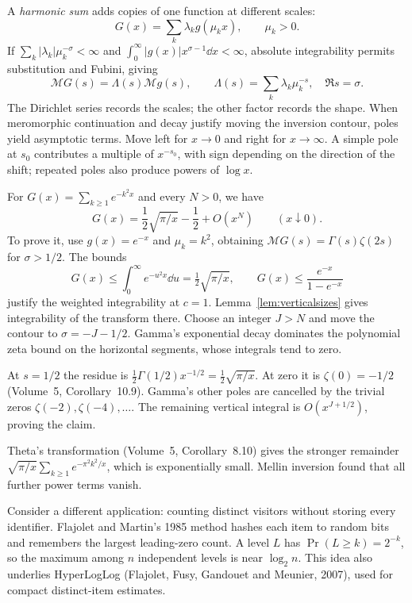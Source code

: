 A \emph{harmonic sum} adds copies of one function at different scales:
\[G(x)=\sum_k\lambda_kg(\mu_kx),\qquad\mu_k>0.\]
If $\sum_k|\lambda_k|\mu_k^{-\sigma}<\infty$ and $\int_0^\infty|g(x)|x^{\sigma-1}\dd x<\infty$, absolute integrability permits substitution and Fubini, giving
\begin{equation}\label{eq:harmonicsum}
\mathcal MG(s)=\Lambda(s)\mathcal Mg(s),\qquad
\Lambda(s)=\sum_k\lambda_k\mu_k^{-s},\quad\Re s=\sigma.
\end{equation}
The Dirichlet series records the scales; the other factor records the shape. When meromorphic continuation and decay justify moving the inversion contour, poles yield asymptotic terms. Move left for $x\to0$ and right for $x\to\infty$. A simple pole at $s_0$ contributes a multiple of $x^{-s_0}$, with sign depending on the direction of the shift; repeated poles also produce powers of $\log x$.

\begin{example}\label{ex:thetamellin}
For $G(x)=\sum_{k\ge1}e^{-k^2x}$ and every $N>0$, we have
\[G(x)=\frac12\sqrt{\pi/x}-\frac12+O(x^N)\qquad(x\downarrow0).
\]
To prove it, use $g(x)=e^{-x}$ and $\mu_k=k^2$, obtaining $\mathcal MG(s)=\Gamma(s)\zeta(2s)$ for $\sigma>1/2$. The bounds
\[G(x)\le\int_0^\infty e^{-u^2x}\dd u=\tfrac12\sqrt{\pi/x},\qquad
G(x)\le\frac{e^{-x}}{1-e^{-x}}
\]
justify the weighted integrability at $c=1$. Lemma~\ref{lem:verticalsizes} gives integrability of the transform there. Choose an integer $J>N$ and move the contour to $\sigma=-J-1/2$. Gamma's exponential decay dominates the polynomial zeta bound on the horizontal segments, whose integrals tend to zero.

At $s=1/2$ the residue is $\tfrac12\Gamma(1/2)x^{-1/2}=\tfrac12\sqrt{\pi/x}$. At zero it is $\zeta(0)=-1/2$ (Volume~5, Corollary~10.9). Gamma's other poles are cancelled by the trivial zeros $\zeta(-2),\zeta(-4),\ldots$. The remaining vertical integral is $O(x^{J+1/2})$, proving the claim.
\end{example}

Theta's transformation (Volume~5, Corollary~8.10) gives the stronger remainder $\sqrt{\pi/x}\sum_{k\ge1}e^{-\pi^2k^2/x}$, which is exponentially small. Mellin inversion found that all further power terms vanish.

Consider a different application: counting distinct visitors without storing every identifier. Flajolet and Martin's 1985 method hashes each item to random bits and remembers the largest leading-zero count. A level $L$ has $\Pr(L\ge k)=2^{-k}$, so the maximum among $n$ independent levels is near $\log_2n$. This idea also underlies HyperLogLog (Flajolet, Fusy, Gandouet and Meunier, 2007), used for compact distinct-item estimates.

